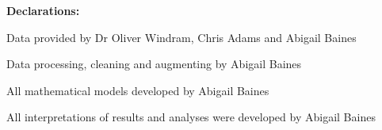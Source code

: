 \thispagestyle{empty}
\null\vskip0.2in%
\begin{center}
\LARGE{{\bf 
Declarations:}}
\end{center}

\vspace{0.5cm}
\begin{center}
{\Large Data provided by Dr Oliver Windram, Chris Adams and Abigail Baines

Data processing, cleaning and augmenting by Abigail Baines

All mathematical models developed by Abigail Baines

All interpretations of results and analyses were developed by Abigail Baines}
\end{center}
\pagebreak
